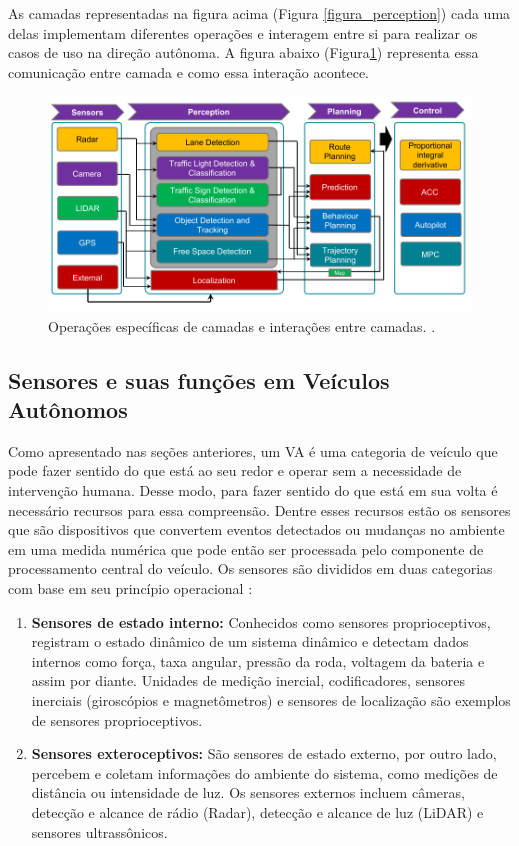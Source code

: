 As camadas representadas na figura acima (Figura \ref{figura_perception}) cada uma delas implementam diferentes operações e interagem entre si para realizar os casos de uso na direção autônoma. A figura abaixo (Figura\ref{figura_camadas}) representa essa comunicação entre camada e como essa interação acontece.

\begin{figure}[H]
\centering
\includegraphics[width=\textwidth]{Figures/layer-sens.png}
\caption{Operações específicas de camadas e interações entre camadas. \cite{sensors-yet}.}
\label{figura_camadas}
\end{figure}



\subsection{Sensores e suas funções em Veículos Autônomos} \label{sensores-a}

Como apresentado nas seções anteriores, um VA é uma categoria de veículo que pode fazer sentido do que está ao seu redor e operar sem a necessidade de intervenção humana. Desse modo, para fazer sentido do que está em sua volta é necessário recursos para essa compreensão. Dentre esses recursos estão os sensores que são dispositivos que convertem eventos detectados ou mudanças no ambiente em uma medida numérica que pode então ser processada pelo componente de processamento central do veículo. 
Os sensores são divididos em duas categorias com base em seu princípio operacional \cite{sensors}: 

\begin{enumerate}
 \item \textbf{Sensores de estado interno:} Conhecidos como sensores proprioceptivos, registram o estado dinâmico de um sistema dinâmico e detectam dados internos como força, taxa angular, pressão da roda, voltagem da bateria e assim por diante. Unidades de medição inercial, codificadores, sensores inerciais (giroscópios e magnetômetros) e sensores de localização são exemplos de sensores proprioceptivos. 
\item \textbf{Sensores exteroceptivos:} São sensores de estado externo, por outro lado, percebem e coletam informações do ambiente do sistema, como medições de distância ou intensidade de luz. Os sensores externos incluem câmeras, detecção e alcance de rádio (Radar), detecção e alcance de luz (LiDAR) e sensores ultrassônicos.

\end{enumerate}



